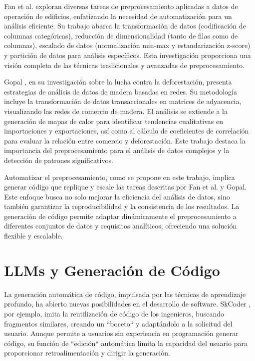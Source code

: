 Fan et al. \cite{fan2021review} exploran diversas tareas de preprocesamiento aplicadas a datos de operación de edificios, enfatizando la necesidad de automatización para un análisis eficiente. Su trabajo abarca la transformación de datos (codificación de columnas categóricas), reducción de dimensionalidad (tanto de filas como de columnas), escalado de datos (normalización min-max y estandarización z-score) y partición de datos para análisis específicos. Esta investigación proporciona una visión completa de las técnicas tradicionales y avanzadas de preprocesamiento.

Gopal \cite{gopal2022network}, en su investigación sobre la lucha contra la deforestación, presenta estrategias de análisis de datos de madera basadas en redes. Su metodología incluye la transformación de datos transaccionales en matrices de adyacencia, visualizando las redes de comercio de madera. El análisis se extiende a la generación de mapas de calor para identificar tendencias cualitativas en importaciones y exportaciones, así como al cálculo de coeficientes de correlación para evaluar la relación entre comercio y deforestación. Este trabajo destaca la importancia del preprocesamiento para el análisis de datos complejos y la detección de patrones significativos.

Automatizar el preprocesamiento, como se propone en este trabajo, implica generar código que replique y escale las tareas descritas por Fan et al. y Gopal. Este enfoque busca no solo mejorar la eficiencia del análisis de datos, sino también garantizar la reproducibilidad y la consistencia de los resultados. La generación de código permite adaptar dinámicamente el preprocesamiento a diferentes conjuntos de datos y requisitos analíticos, ofreciendo una solución flexible y escalable.

\section{LLMs y Generación de Código}

La generación automática de código, impulsada por las técnicas de aprendizaje profundo, ha abierto nuevas posibilidades en el desarrollo de software. SkCoder \cite{li2023skcoder}, por ejemplo, imita la reutilización de código de los ingenieros, buscando fragmentos similares, creando un ``boceto`` y adaptándolo a la solicitud del usuario. Aunque permite a usuarios sin experiencia en programación generar código, su función de ``edición`` automática limita la capacidad del usuario para proporcionar retroalimentación y dirigir la generación.

